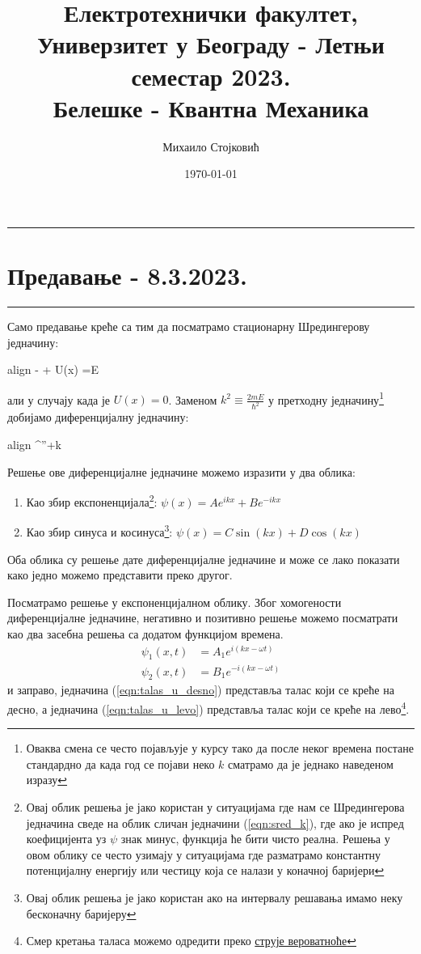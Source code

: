 \documentclass{tufte-handout} %
\title{	
	\normalfont\normalsize 
	{Електротехнички факултет, Универзитет у Београду - Летњи семестар 2023.} \\ [0pt] %
	\huge Белешке - Квантна Механика%
}\author{Михаило Стојковић} %
\date{\vspace{-5pt}\normalsize\today} %
\newcommand{\boxedeq}[1]{\begin{empheq}[box={\fboxsep=6pt\fbox}]{align} #1\end{empheq}}
\theoremstyle{definition}
\theoremstyle{remark}
\newcommand{\shreq}[2]{-\frac{\hbar^2}{2m}\frac{\partial^2 #1}{\partial #2^2} + U(#2) #1 =E #1}
\newcommand{\kpsi}{\psi^{''}+k\psi=0}
\begin{document}
\justifying 
\maketitle

\tableofcontents
\newpage
\vspace{1em}
\hrule
\section{Предавање - 8.3.2023.}
\hrule
\vspace{1em}
Само предавање креће са тим да посматрамо стационарну Шредингерову једначину:
	\boxedeq{\shreq{\psi}{x}}
али у случају када је $U(x)=0$. Заменом $k^2\equiv\frac{2mE}{\hbar^2}$ у претходну једначину\footnote{Оваква смена се често појављује у курсу тако да после неког времена постане стандардно да када год се појави неко $k$ сматрамо да је једнако наведеном изразу} добијамо диференцијалну једначину:
	\boxedeq{\label{eqn:sred_k}\kpsi}
Решење ове диференцијалне једначине можемо изразити у два облика:
\begin{enumerate}
	\item Као збир експоненцијала\footnote{Овај облик решења је јако користан у ситуацијама где нам се Шредингерова једначина сведе на облик сличан једначини (\ref{eqn:sred_k}), где ако је испред коефицијента уз $\psi$ знак минус, функција ће бити чисто реална. Решења у овом облику се често узимају у ситуацијама где разматрамо константну потенцијалну енергију или честицу која се налази у коначној баријери}: $\psi(x)=Ae^{ikx} + Be^{-ikx}$
	\item Као збир синуса и косинуса\footnote{Овај облик решења је јако користан ако на интервалу решавања имамо неку бесконачну баријеру}: $\psi(x)=C\sin(kx)+D\cos(kx)$
\end{enumerate}
Оба облика су решење дате диференцијалне једначине и може се лако показати како једно можемо представити преко другог.\par
Посматрамо решење у експоненцијалном облику. Због хомогености диференцијалне једначине, негативно и позитивно решење можемо посматрати као два засебна решења са додатом функцијом времена.
\begin{align}
	\label{eqn:talas_u_desno}\psi_1(x,t)&=A_1e^{i(kx-\omega t)}\\
	\label{eqn:talas_u_levo}\psi_2(x,t)&=B_1e^{-i(kx-\omega t)} 
\end{align}
и заправо, једначина (\ref{eqn:talas_u_desno}) представља талас који се креће на десно, а једначина (\ref{eqn:talas_u_levo}) представља талас који се креће на лево\footnote{Смер кретања таласа можемо одредити преко \hyperref[]{струје вероватноће}}.
\end{document}
